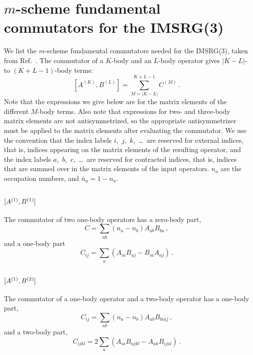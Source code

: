 \chapter{\texorpdfstring{$m$-scheme}{M-scheme} fundamental commutators for the IMSRG(3)}\label{app:mscheme_fundamental_commutators}

We list the $m$-scheme fundamental commutators needed for the IMSRG(3),
taken from Ref.~\cite{Herg15imsrgphysrep}.
The commutator of a $K$-body and an $L$-body operator
gives $|K-L|$- to $(K+L-1)$-body terms:
\begin{equation}
  \left[A^{(K)}, B^{(L)}\right] = \sum_{M=|K - L|}^{K + L - 1} C^{(M)}\,.
\end{equation}
Note that the expressions we give below are
for the matrix elements of the different $M$-body terms.
Also note that expressions for two- and three-body matrix elements
are not antisymmetrized,
so the appropriate antisymmetrizer must be applied
to the matrix elements after evaluating the commutator.
We use the convention that the index labels $i$,~$j$,~$k$,~\ldots\
are reserved for external indices,
that is, indices appearing on the matrix elements of the resulting operator,
and the index labels $a$,~$b$,~$c$,~\ldots\
are reserved for contracted indices,
that is, indices that are summed over in the matrix elements of the input operators.
$n_a$ are the occupation numbers,
and $\bar{n}_a = 1 - n_a$.

\section{
  \texorpdfstring{$[{A}^{(1)}, {B}^{(1)}]$}{[1, 1]}
 }

The commutator of two one-body operators
has a zero-body part,
\begin{equation}
  C = \sum_{ab} (n_a - n_b) A_{ab} B_{ba}\,,
\end{equation}
and a one-body part
\begin{equation}
  C_{ij} = \sum_{a}(A_{ia} B_{aj} - B_{ia} A_{aj})\,.
\end{equation}

\section{
  \texorpdfstring{$[{A}^{(1)}, {B}^{(2)}]$}{[1, 2]}
 }

The commutator of a one-body operator and a two-body operator
has a one-body part,
\begin{equation}
  C_{ij} = \sum_{ab} (n_a - n_b) A_{ab} B_{biaj}\,,
\end{equation}
and a two-body part,
\begin{equation}
  C_{ijkl} = 2 \sum_{a} (A_{ia} B_{ajkl} - A_{ak} B_{ijal})\,.
\end{equation}

